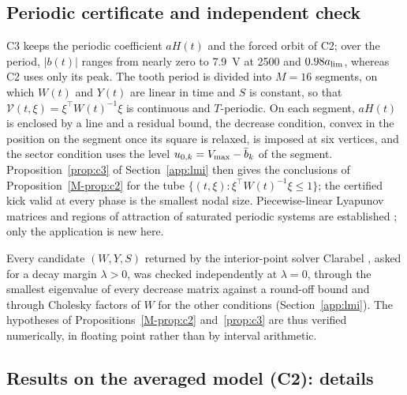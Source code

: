 \subsection{Periodic certificate and independent check}\label{supp:std-periodic}

C3 keeps the periodic coefficient $aH(t)$ and the forced orbit of C2; over the period, $\lvert b(t)\rvert$ ranges from nearly zero to \SI{7.9}{\volt} at \SI{2500}{\rpm} and $0.98a_{\lim}$, whereas C2 uses only its peak. The tooth period is divided into $M=16$ segments, on which $W(t)$ and $Y(t)$ are linear in time and $S$ is constant, so that $\mathcal V(t,\xi)=\xi^\top W(t)^{-1}\xi$ is continuous and $T$-periodic. On each segment, $aH(t)$ is enclosed by a line and a residual bound, the decrease condition, convex in the position on the segment once its square is relaxed, is imposed at six vertices, and the sector condition uses the level $u_{0,k}=V_{\max}-\bar b_k$ of the segment. Proposition~\ref{prop:c3} of Section~\ref{app:lmi} then gives the conclusions of Proposition~\ref{M-prop:c2} for the tube $\{(t,\xi):\xi^\top W(t)^{-1}\xi\le1\}$; the certified kick valid at every phase is the smallest nodal size. Piecewise-linear Lyapunov matrices and regions of attraction of saturated periodic systems are established \citep{allerhand2011robust,briat2013clock,li2015periodic,zhou2011periodic,yang2015periodic}; only the application is new here.

Every candidate $(W,Y,S)$ returned by the interior-point solver Clarabel \citep{goulart2024clarabel}, asked for a decay margin $\lambda>0$, was checked independently at $\lambda=0$, through the smallest eigenvalue of every decrease matrix against a round-off bound and through Cholesky factors of $W$ for the other conditions (Section~\ref{app:lmi}). The hypotheses of Propositions~\ref{M-prop:c2} and~\ref{prop:c3} are thus verified numerically, in floating point rather than by interval arithmetic.

\subsection{Results on the averaged model (C2): details}\label{supp:std-c2}


